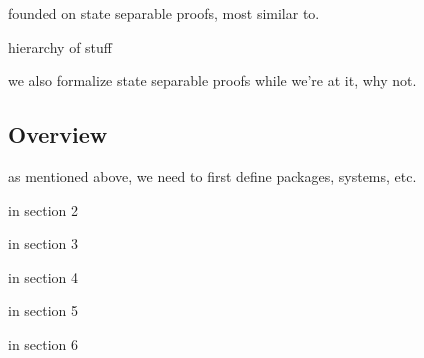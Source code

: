 founded on state separable proofs,
most similar to.

hierarchy of stuff

we also formalize state separable proofs while we're at it, why not.

\subsection{Overview}

as mentioned above, we need to first define packages,
systems, etc.

in section 2

in section 3

in section 4

in section 5

in section 6
